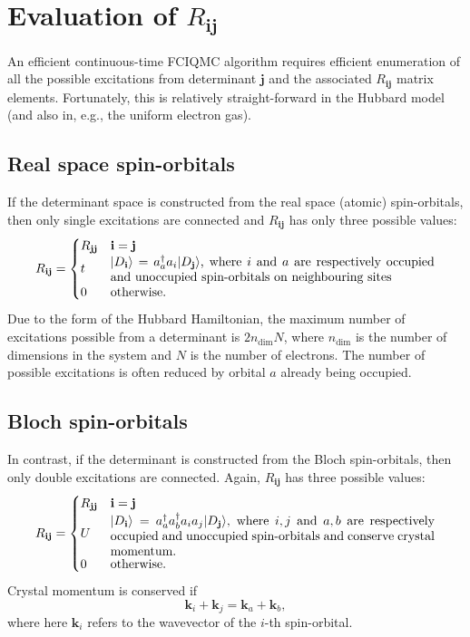 \documentclass[a4paper, 11pt]{article}
\newcommand{\bi}{\mathbf{i}}
\newcommand{\bj}{\mathbf{j}}
\newcommand{\bk}{\mathbf{k}}
\newcommand{\ket}{\rangle}
\begin{document}
\appendix
\section{Evaluation of $R_{\bi\bj}$}

An efficient continuous-time FCIQMC algorithm requires efficient enumeration of all the possible excitations from determinant $\bj$ and the associated $R_{\bi\bj}$ matrix elements.  Fortunately, this is relatively straight-forward in the Hubbard model (and also in, e.g., the uniform electron gas).

\subsection{Real space spin-orbitals}

If the determinant space is constructed from the real space (atomic) spin-orbitals, then only single excitations are connected and $R_{\bi\bj}$ has only three possible values:
\begin{equation}
R_{\bi\bj} = \begin{cases} 
    R_{\bj\bj} & \bi = \bj \\
    t          & \textrm{\parbox{9cm}{$|D_\bi\ket=a^\dagger_a a_i|D_\bj\ket$, where $i$ and $a$ are respectively occupied and unoccupied spin-orbitals on neighbouring sites}} \\
    0          & \textrm{otherwise.}
\end{cases}
\end{equation}
Due to the form of the Hubbard Hamiltonian, the maximum number of excitations possible from a determinant is $2n_\textrm{dim}N$, where $n_\textrm{dim}$ is the number of dimensions in the system and $N$ is the number of electrons.  The number of possible excitations is often reduced by orbital $a$ already being occupied.

\subsection{Bloch spin-orbitals}

In contrast, if the determinant is constructed from the Bloch spin-orbitals, then only double excitations are connected.  Again, $R_{\bi\bj}$ has three possible values:
\begin{equation}
R_{\bi\bj} = \begin{cases} 
    R_{\bj\bj} & \bi = \bj \\
    U          & \textrm{\parbox{9cm}{$|D_\bi\ket=a^\dagger_a a^\dagger_b a_i a_j|D_\bj\ket$, where $i,j$ and $a,b$ are respectively occupied and unoccupied spin-orbitals and conserve crystal momentum.}} \\
    0          & \textrm{otherwise.}
\end{cases}
\end{equation}
Crystal momentum is conserved if 
\begin{equation}
\bk_i + \bk_j = \bk_a + \bk_b,
\end{equation}
where here $\bk_i$ refers to the wavevector of the $i$-th spin-orbital.
\end{document}
